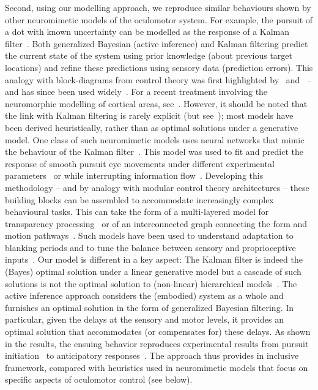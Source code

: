 \documentclass[a4paper]{article} %
\begin{document}
Second, using our modelling approach, we reproduce similar behaviours
shown by other neuromimetic models of the oculomotor system. For
example, the pursuit of a dot with known uncertainty can be modelled as
the response of a Kalman filter~\citep{Kalman60}. Both generalized Bayesian
(active inference) and Kalman filtering predict the current state of the
system using prior knowledge (about previous target locations) and
refine these predictions using sensory data (prediction errors). This
analogy with block-diagrams from control theory was first highlighted by~\citep{Robinson86} and~\citep{Krauzlis89} -- and has
since been used widely~\citep{Grossberg97}. For a recent treatment involving the neuromorphic modelling of cortical areas, see~\citep{Shibata05}. However, it should be
noted that the link with Kalman filtering is rarely explicit (but see~\citep{deXivry2013Kalman}); most
models have been derived heuristically, rather than as optimal solutions
under a generative model. One class of such neuromimetic models uses
neural networks that mimic the behaviour of the Kalman filter~\citep{Haykin01}. This model was used to fit and predict the response of smooth
pursuit eye movements under different experimental parameters~\citep{Montagnini07} or while interrupting information flow~\citep{Bogadhi11}. Developing this methodology -- and by analogy with
modular control theory architectures -- these building blocks can be
assembled to accommodate increasingly complex behavioural tasks. This
can take the form of a multi-layered model for transparency processing~\citep{Raudies11} or of an interconnected graph connecting the form
and motion pathways~\citep{Beck08b}. Such models have been used to
understand adaptation to blanking periods and to tune the balance
between sensory and proprioceptive inputs~\citep{Madelain03}.
Our model is different in a key aspect: The Kalman filter is indeed the
(Bayes) optimal solution under a linear generative model but a cascade
of such solutions is not the optimal solution to (non-linear)
hierarchical models~\citep{Balaji11}. 
The active inference approach considers the (embodied) system as a whole and furnishes an optimal solution in the form of generalized Bayesian filtering. In particular, given the delays at the sensory and motor levels, it provides an optimal solution that accommodates (or compensates for) these delays. As shown in the results, the ensuing behavior reproduces experimental results from pursuit initiation~\citep{Masson10} to anticipatory responses~\citep{Avila06,Barnes00}. The approach thus provides in inclusive framework, compared with heuristics used in neuromimetic models that focus on specific aspects of oculomotor control (see below). %
\end{document}
